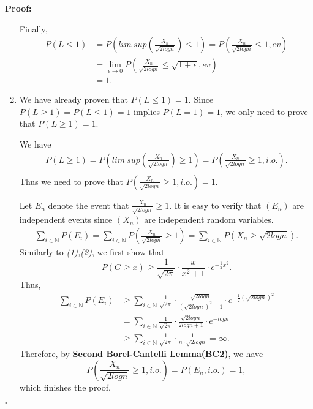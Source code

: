 \documentclass[UTF8, 12pt]{article}
\newenvironment{proof}{\noindent\ignorespaces\textbf{Proof:}}{\hfill $\square$\par\noindent}
\theoremstyle{break}
\begin{document}
\begin{proof}
\begin{enumerate}
            Finally,
            \begin{align*}
                P(L \leq 1) &= P( lim\ sup(\frac{X_n}{\sqrt{2logn}}) \leq 1) = P(\frac{X_n}{\sqrt{2logn}} \leq 1, ev) \\
                &= \lim_{\epsilon\to 0} P(\frac{X_n}{\sqrt{2logn}} \leq \sqrt{1 + \epsilon}, ev) \\
                &= 1.
            \end{align*}
            
            \item We have already proven that $P(L \leq 1) = 1$. Since $ P(L \geq 1) = P(L \leq 1) = 1$ implies $P(L = 1) = 1$, we only need to prove that $ P(L \geq 1) = 1$.
            
            We have
            \begin{align*}
                P(L \geq 1) = P(lim\ sup(\frac{X_n}{\sqrt{2logn}}) \geq 1) = P(\frac{X_n}{\sqrt{2logn}} \geq 1, i.o.). \\ 
            \end{align*}
            Thus we need to prove that $P(\frac{X_n}{\sqrt{2logn}} \geq 1, i.o.) = 1$.

            Let $E_n$ denote the event that $\frac{X_n}{\sqrt{2logn}} \geq 1$. It is easy to verify that $(E_n)$ are independent events since $(X_n)$ are independent random variables.
            \begin{align*}
                \sum_{i \in \mathbb{N}} P(E_i) = \sum_{i \in \mathbb{N}} P(\frac{X_n}{\sqrt{2logn}} \geq 1) = \sum_{i \in \mathbb{N}} P(X_n \geq \sqrt{2logn}).
            \end{align*}
            Similarly to \textit{(1),(2)}, we first show that $$ P(G \geq x) \geq \frac{1}{\sqrt{2\pi}}\cdot \frac{x}{x^2+1} \cdot e^{-\frac{1}{2}x^2}. $$
            Thus,
            \begin{align*}
                \sum_{i \in \mathbb{N}} P(E_i) &\geq \sum_{i \in \mathbb{N}} \frac{1}{\sqrt{2\pi}}\cdot \frac{\sqrt{2logn}}{(\sqrt{2logn})^2+1} \cdot e^{-\frac{1}{2}(\sqrt{2logn})^2} \\
                &= \sum_{i \in \mathbb{N}} \frac{1}{\sqrt{2\pi}}\cdot \frac{\sqrt{2logn}}{2logn+1} \cdot e^{-logn} \\
                &\geq \sum_{i \in \mathbb{N}} \frac{1}{\sqrt{2\pi}} \cdot \frac{1}{n \cdot \sqrt{2logn}} = \infty.
            \end{align*}
            Therefore, by \textbf{Second Borel-Cantelli Lemma(BC2)}, we have $$ P(\frac{X_n}{\sqrt{2logn}} \geq 1, i.o.) = P(E_n, i.o.) = 1, $$ which finishes the proof.
        \end{enumerate}
    \end{proof}
\end{document}
